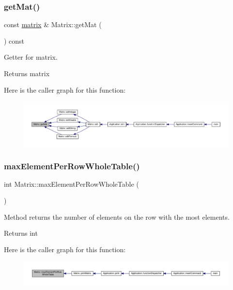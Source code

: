 \subsubsection{\texorpdfstring{get\+Mat()}{getMat()}}
{\footnotesize\ttfamily const \hyperlink{formula_8h_a869e2a5deeb3daa4c82d6bc91cf20d92}{matrix} \& Matrix\+::get\+Mat (\begin{DoxyParamCaption}{ }\end{DoxyParamCaption}) const}

Getter for matrix. \begin{DoxyReturn}{Returns}
matrix 
\end{DoxyReturn}
Here is the caller graph for this function\+:\nopagebreak
\begin{figure}[H]
\begin{center}
\leavevmode
\includegraphics[width=350pt]{class_matrix_a52d82641f52304c9b6525747cd7f960c_icgraph}
\end{center}
\end{figure}
\mbox{\label{class_matrix_a8620c5426a31cf8fe0072df32bb3f65d}} 
\subsubsection{\texorpdfstring{max\+Element\+Per\+Row\+Whole\+Table()}{maxElementPerRowWholeTable()}}
{\footnotesize\ttfamily int Matrix\+::max\+Element\+Per\+Row\+Whole\+Table (\begin{DoxyParamCaption}{ }\end{DoxyParamCaption})\hspace{0.3cm}{\ttfamily [private]}}

Method returns the number of elements on the row with the most elements. \begin{DoxyReturn}{Returns}
int 
\end{DoxyReturn}
Here is the caller graph for this function\+:\nopagebreak
\begin{figure}[H]
\begin{center}
\leavevmode
\includegraphics[width=350pt]{class_matrix_a8620c5426a31cf8fe0072df32bb3f65d_icgraph}
\end{center}
\end{figure}
\mbox{\label{class_matrix_a60dac9b70e73a12d2adb32d6be9ff65d}} 
